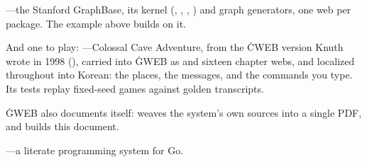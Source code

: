 \bull {}---the Stanford GraphBase,
its kernel (, , , ) and graph
generators, one web per package. The  example above builds on it.

\noindent And one to play: %
---Colossal Cave Adventure, from the \.{CWEB} version Knuth wrote in 1998
(), carried into \.{GWEB} as  and sixteen chapter
webs, and localized throughout into Korean: the places, the messages, and the
commands you type. Its tests replay fixed-seed games against golden transcripts.

\noindent \.{GWEB} also documents itself:  weaves the system's own
 sources into a single PDF, and  builds this document.

\vfill
\centerline{---a literate programming system for Go.}
\bye
